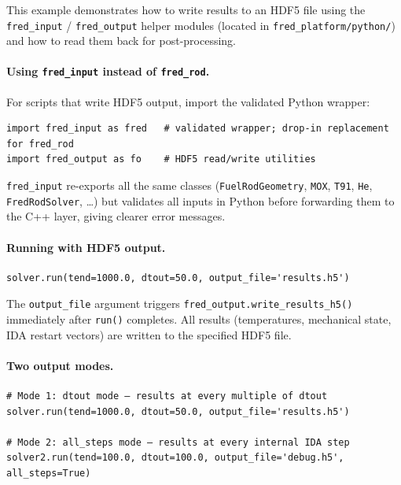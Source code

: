 \documentclass[11pt,a4paper]{article}
\begin{document}
\medskip
This example demonstrates how to write results to an HDF5 file using the
\texttt{fred\_input} / \texttt{fred\_output} helper modules (located in
\texttt{fred\_platform/python/}) and how to read them back for post-processing.

\paragraph{Using \texttt{fred\_input} instead of \texttt{fred\_rod}.}

For scripts that write HDF5 output, import the validated Python wrapper:

\begin{lstlisting}
import fred_input as fred   # validated wrapper; drop-in replacement for fred_rod
import fred_output as fo    # HDF5 read/write utilities
\end{lstlisting}

\texttt{fred\_input} re-exports all the same classes (\texttt{FuelRodGeometry},
\texttt{MOX}, \texttt{T91}, \texttt{He}, \texttt{FredRodSolver}, \ldots) but
validates all inputs in Python before forwarding them to the C++ layer, giving
clearer error messages.

\paragraph{Running with HDF5 output.}

\begin{lstlisting}
solver.run(tend=1000.0, dtout=50.0, output_file='results.h5')
\end{lstlisting}

The \texttt{output\_file} argument triggers \texttt{fred\_output.write\_results\_h5()}
immediately after \texttt{run()} completes.  All results (temperatures,
mechanical state, IDA restart vectors) are written to the specified HDF5 file.

\paragraph{Two output modes.}

\begin{lstlisting}
# Mode 1: dtout mode — results at every multiple of dtout
solver.run(tend=1000.0, dtout=50.0, output_file='results.h5')

# Mode 2: all_steps mode — results at every internal IDA step
solver2.run(tend=100.0, dtout=100.0, output_file='debug.h5', all_steps=True)
\end{lstlisting}
\end{document}
